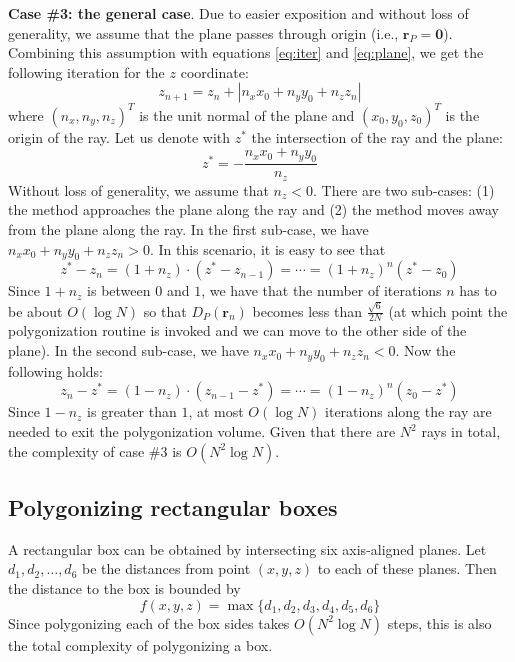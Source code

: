 \documentclass[11pt,twocolumn]{article}
\begin{document}
			\textbf{Case \#3: the general case}.
			Due to easier exposition and without loss of generality, we assume that the plane passes through origin (i.e., $\mathbf{r}_P=\mathbf{0}$).
			Combining this assumption with equations \eqref{eq:iter} and \eqref{eq:plane}, we get the following iteration for the $z$ coordinate:
			\begin{equation}
				z_{n+1}=
				z_n + \left| n_x x_0 + n_y y_0 + n_z z_n \right|
			\end{equation}
			where $(n_x, n_y, n_z)^T$ is the unit normal of the plane and $(x_0, y_0, z_0)^T$ is the origin of the ray.
			Let us denote with $z^*$ the intersection of the ray and the plane:
			\begin{equation}
				z^*=
				-\frac{n_x x_0 + n_y y_0}{n_z}
			\end{equation}
			Without loss of generality, we assume that $n_z<0$.
			There are two sub-cases:
			(1) the method approaches the plane along the ray and (2) the method moves away from the plane along the ray.
			In the first sub-case, we have $n_x x_0 + n_y y_0 + n_z z_n > 0$.
			In this scenario, it is easy to see that
			\begin{equation}
				z^* - z_n =
				(1 + n_z)\cdot (z^* - z_{n-1})=
				\cdots=
				(1 + n_z)^n (z^* - z_0)
			\end{equation}
			Since $1 + n_z$ is between $0$ and $1$, we have that the number of iterations $n$ has to be about $O(\log N)$ so that $D_P(\mathbf{r}_n)$ becomes less than $\frac{\sqrt{6}}{2N}$
			(at which point the polygonization routine is invoked and we can move to the other side of the plane).
			In the second sub-case, we have $n_x x_0 + n_y y_0 + n_z z_n < 0$.
			Now the following holds:
			\begin{equation}
				z_n - z^* =
				(1 - n_z)\cdot (z_{n-1} - z^*)=
				\cdots=
				(1 - n_z)^n (z_0 - z^*)
			\end{equation}
			Since $1 - n_z$ is greater than $1$, at most $O(\log N)$ iterations along the ray are needed to exit the polygonization volume.
			Given that there are $N^2$ rays in total, the complexity of case \#3 is $O(N^2\log N)$.

		\subsection{Polygonizing rectangular boxes}
			A rectangular box can be obtained by intersecting six axis-aligned planes.
			Let $d_1, d_2, \ldots, d_6$ be the distances from point $(x, y, z)$ to each of these planes.
			Then the distance to the box is bounded by
			\begin{equation}\label{eq:boxdist}
				f(x, y, z)=
				\max\{d_1, d_2, d_3, d_4, d_5, d_6\}
			\end{equation}
			Since polygonizing each of the box sides takes $O(N^2\log N)$ steps, this is also the total complexity of polygonizing a box.
\end{document}
